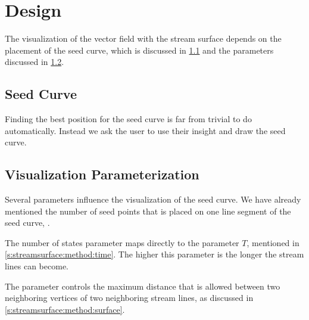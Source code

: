 \section{Design}
\label{s:streamsurfaces:design}

The visualization of the vector field with the stream surface depends on the placement of the seed curve, which is discussed in \cref{s:streamsurfaces:design:seedcurve} and the parameters discussed in \cref{s:streamsurfaces:design:parameterization}.

\subsection{Seed Curve}
\label{s:streamsurfaces:design:seedcurve}
Finding the best position for the seed curve is far from trivial to do automatically. Instead we ask the user to use their insight and draw the seed curve. 

\subsection{Visualization Parameterization}
\label{s:streamsurfaces:design:parameterization}
Several parameters influence the visualization of the seed curve. We have already mentioned the number of seed points that is placed on one line segment of the seed curve, \ie \resolution. 

The number of states parameter maps directly to the parameter $T$, mentioned in \cref{s:streamsurface:method:time}. The higher this parameter is the longer the stream lines can become. 

The parameter \divergenceCriterion controls the maximum distance that is allowed between two neighboring vertices of two neighboring stream lines, as discussed in \cref{s:streamsurface:method:surface}.